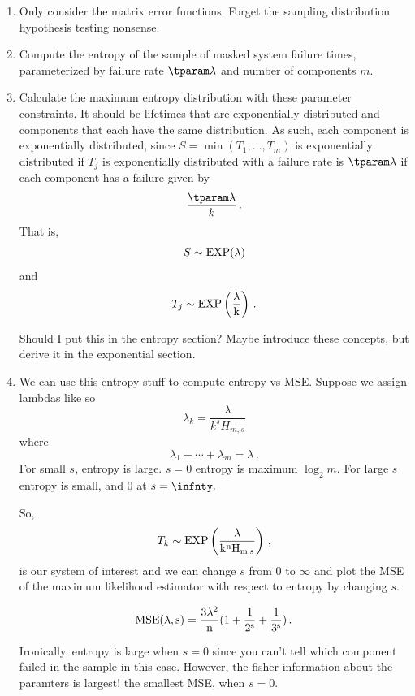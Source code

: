 \documentclass[hidelinks,11pt]{article}
\newcommand{\harmonic}[2]{H_{#1,#2}}
\begin{document}
\begin{enumerate}
    \item Only consider the matrix error functions. Forget the sampling distribution hypothesis testing nonsense.
    \item Compute the entropy of the sample of masked system failure times, parameterized by failure rate $\tparam\lambda$ and number of components $m$.
    \item Calculate the maximum entropy distribution with these parameter constraints. It should be lifetimes that are exponentially distributed and components that each have the same distribution. As such, each component is exponentially distributed, since $S = \min(T_1, \ldots, T_m)$ is exponentially distributed if $T_j$ is exponentially distributed with a failure rate is $\tparam\lambda$ if each component has a failure given by
    \begin{equation}
        \frac{\tparam\lambda}{k}\,.
    \end{equation}
    That is,
    \begin{equation}
        S \sim \rm{EXP}(\lambda)
    \end{equation}
    and
    \begin{equation}
        T_j \sim \rm{EXP}\left(\frac{\lambda}{k}\right)\,.
    \end{equation}
    
    Should I put this in the entropy section? Maybe introduce these concepts, but derive it in the exponential section.
    
    \item We can use this entropy stuff to compute entropy vs MSE.
    Suppose we assign lambdas like so
    \begin{equation}
        \lambda_k = \frac{\lambda}{k^s \harmonic{m}{s}}
    \end{equation}
    where
    \begin{equation}
        \lambda_1 + \cdots + \lambda_m = \lambda\,.
    \end{equation}
    For small $s$, entropy is large. $s=0$ entropy is maximum $\log_2 m$. For large $s$ entropy is small, and $0$ at $s=\infnty.$
    
    So,
    \begin{equation}
        T_k \sim \rm{EXP}\left(\frac{\lambda}{k^n \harmonic{m}{s}}\right)\,,
    \end{equation}
    is our system of interest and we can change $s$ from $0$ to $\infty$ and plot
    the MSE of the maximum likelihood estimator with respect to entropy by changing
    $s$.
    
    \[
        \rm{MSE}(\lambda, s) = \frac{3 \lambda^2}{n}(1+\frac{1}{2^s}+\frac{1}{3^s})\,.
    \]
    
    Ironically, entropy is large when $s=0$ since you can't tell which component failed in the sample in this case. However, the fisher information about the paramters is largest! the smallest MSE, when $s=0$.
\end{enumerate}
\end{document}
